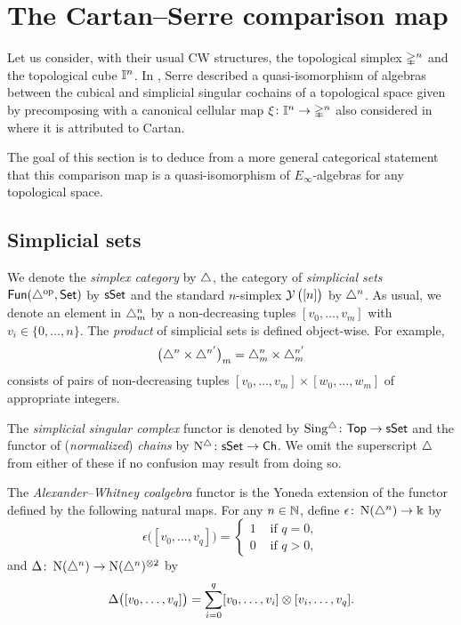 
\section{The Cartan--Serre comparison map} \label{s:the cartan-serre comparison map}

Let us consider, with their usual CW structures, the topological simplex $\mathbb{\Delta}^n$ and the topological cube $\mathbb{I}^n$.
In \cite[p. 442]{serre1951homologie}, Serre described a quasi-isomorphism of algebras between the cubical and simplicial singular cochains of a topological space given by precomposing with a canonical cellular map $\operatorname{\xi} \colon \mathbb{I}^n \to \mathbb{\Delta}^n$ also considered in \cite[p.199]{eilenberg1953acyclic} where it is attributed to Cartan.

The goal of this section is to deduce from a more general categorical statement that this comparison map is a quasi-isomorphism of $E_\infty$-algebras for any topological space.

\subsection{Simplicial sets} \label{ss:simplicial sets}

We denote the \textit{simplex category} by $\triangle$, the category of \textit{simplicial sets} $\mathsf{Fun}(\triangle^{\mathrm{op}}, \mathsf{Set})$ by $\mathsf{sSet}$ and the standard $n$-simplex $\operatorname{\mathcal{Y}}\big( [n] \big)$ by $\triangle^n$.
As usual, we denote an element in $\triangle^n_m$ by a non-decreasing tuples $[v_0, \dots, v_m]$ with $v_i \in \{0, \dots, n\}$.
The \textit{product} of simplicial sets is defined object-wise.
For example,
\[
\big(\triangle^n \times \triangle^{n^\prime}\big)_m = \triangle^n_m \times \triangle^{n^\prime}_m
\]
consists of pairs of non-decreasing tuples $[v_0, \dots, v_m] \times [w_0, \dots, w_m]$ of appropriate integers.

The \textit{simplicial singular complex} functor is denoted by $\operatorname{Sing^{\triangle}} \colon \mathsf{Top} \to \mathsf{sSet}$ and the functor of (\textit{normalized}) \textit{chains} by $\operatorname{N^{\triangle}} \colon \mathsf{sSet} \to \mathsf{Ch}$.
We omit the superscript $\triangle$ from either of these if no confusion may result from doing so.

The \textit{Alexander--Whitney coalgebra} functor is the Yoneda extension of the functor defined by the following natural maps.
For any $n \in \mathbb{N}$, define $\epsilon \colon \operatorname{N}(\triangle^n) \to \Bbbk$ by
\[
\epsilon \big( [v_0, \dots, v_q] \big) = \begin{cases} 1 & \text{ if } q = 0, \\ 0 & \text{ if } q>0, \end{cases}
\]
and $\Delta \colon \operatorname{N}(\triangle^n) \to \operatorname{N}(\triangle^n)^{\otimes 2}$ by
\[
\Delta \big( [v_0, \dots, v_q] \big) = \sum_{i=0}^q [v_0, \dots, v_i] \otimes [v_i, \dots, v_q].
\]

